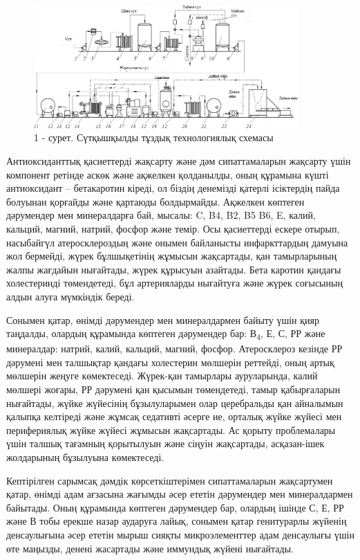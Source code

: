 \begin{figure}[H]
	\centering
	\includegraphics[width=0.9\textwidth]{media/pish2/image24}
	\caption*{1 - сурет. Сүтқышқылды тұздық технологиялық схемасы}
\end{figure}

\begin{multicols}{2}
Антиоксиданттық қасиеттерді жақсарту және дәм сипаттамаларын жақсарту
үшін компонент ретінде аскөк және ақжелкен қолданылды, оның құрамына
күшті антиоксидант -- бетакаротин кіреді, ол біздің денемізді қатерлі
ісіктердің пайда болуынан қорғайды және қартаюды болдырмайды. Ақжелкен
көптеген дәрумендер мен минералдарға бай, мысалы: C, B4, B2, B5 B6, E,
калий, кальций, магний, натрий, фосфор және темір. Осы қасиеттерді
ескере отырып, насыбайгүл атеросклероздың және онымен байланысты
инфаркттардың дамуына жол бермейді, жүрек бұлшықетінің жұмысын
жақсартады, қан тамырларының жалпы жағдайын нығайтады, жүрек құрысуын
азайтады. Бета каротин қандағы холестеринді төмендетеді, бұл
артерияларды нығайтуға және жүрек соғысының алдын алуға мүмкіндік
береді.

Сонымен қатар, өнімді дәрумендер мен минералдармен байыту үшін қияр
таңдалды, олардың құрамында көптеген дәрумендер бар: В\textsubscript{4},
Е, С, РР және минералдар: натрий, калий, кальций, магний, фосфор.
Атеросклероз кезінде РР дәрумені мен талшықтар қандағы холестерин
мөлшерін реттейді, оның артық мөлшерін жеңуге көмектеседі. Жүрек-қан
тамырлары ауруларында, калий мөлшері жоғары, РР дәрумені қан қысымын
төмендетеді, тамыр қабырғаларын нығайтады, жүйке жүйесінің бұзылуларымен
олар церебральды қан айналымын қалыпқа келтіреді және жұмсақ седативті
әсерге ие, орталық жүйке жүйесі мен перифериялық жүйке жүйесі жұмысын
жақсартады. Ас қорыту проблемалары үшін талшық тағамның қорытылуын және
сіңуін жақсартады, асқазан-ішек жолдарының бұзылуына көмектеседі.

Кептірілген сарымсақ дәмдік көрсеткіштерімен сипаттамаларын жақсартумен
қатар, өнімді адам ағзасына жағымды әсер ететін дәрумендер мен
минералдармен байытады. Оның құрамында көптеген дәрумендер бар, олардың
ішінде С, Е, РР және В тобы ерекше назар аударуға лайық, сонымен қатар
генитурарлы жүйенің денсаулығына әсер ететін мырыш сияқты
микроэлементтер адам денсаулығы үшін өте маңызды, денені жасартады және
иммундық жүйені нығайтады.


\end{multicols}
